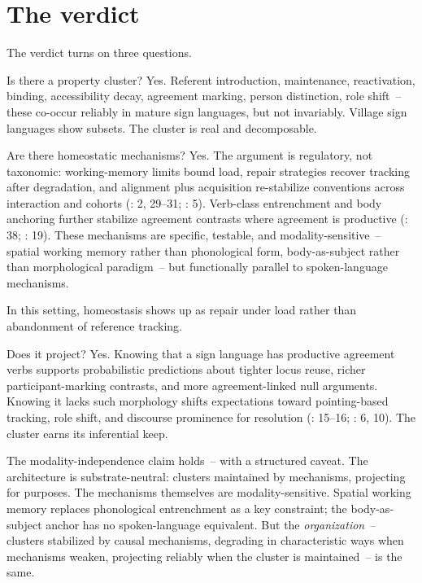\section{The verdict}
\label{sec:sign:verdict}

The verdict turns on three questions.

Is there a property cluster? Yes. Referent introduction, maintenance, reactivation, binding, accessibility decay, agreement marking, person distinction, role shift~-- these co-occur reliably in mature sign languages, but not invariably. Village sign languages show subsets. The cluster is real and decomposable.

Are there homeostatic mechanisms? Yes. The argument is regulatory, not taxonomic: working-memory limits bound load, repair strategies recover tracking after degradation, and alignment plus acquisition re-stabilize conventions across interaction and cohorts (\citealt{steinbach2016}: 2, 29--31; \citealt{senghas2001}: 5). Verb-class entrenchment and body anchoring further stabilize agreement contrasts where agreement is productive (\citealt{sandler2006}: 38; \citealt{padden2010}: 19). These mechanisms are specific, testable, and modality-sensitive~-- spatial working memory rather than phonological form, body-as-subject rather than morphological paradigm~-- but functionally parallel to spoken-language mechanisms.

In this setting, homeostasis shows up as repair under load rather than abandonment of reference tracking.

Does it project? Yes. Knowing that a sign language has productive agreement verbs supports probabilistic predictions about tighter locus reuse, richer participant-marking contrasts, and more agreement-linked null arguments. Knowing it lacks such morphology shifts expectations toward pointing-based tracking, role shift, and discourse prominence for resolution (\citealt{sandler2006}: 15--16; \citealt{steinbach2016}: 6, 10). The cluster earns its inferential keep.

The modality-independence claim holds~-- with a structured caveat. The architecture is substrate-neutral: clusters maintained by mechanisms, projecting for purposes. The mechanisms themselves are modality-sensitive. Spatial working memory replaces phonological entrenchment as a key constraint; the body-as-subject anchor has no spoken-language equivalent. But the \textit{organization}~-- clusters stabilized by causal mechanisms, degrading in characteristic ways when mechanisms weaken, projecting reliably when the cluster is maintained~-- is the same.

